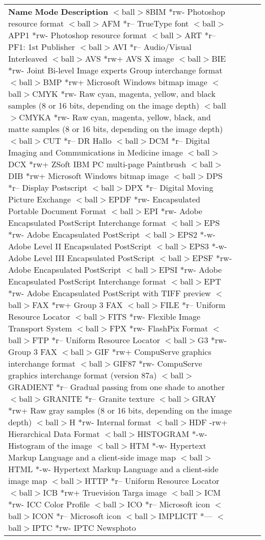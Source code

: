 \begin{longtable}{llll}

{\bf Name}	{\bf Mode}	{\bf Description}
$<$ball$>$8BIM	*rw-	Photoshop resource format
$<$ball$>$AFM	*r--	TrueType font
$<$ball$>$APP1	*rw-	Photoshop resource format
$<$ball$>$ART	*r--	PF1: 1st Publisher
$<$ball$>$AVI	*r--	Audio/Visual Interleaved
$<$ball$>$AVS	*rw+	AVS X image
$<$ball$>$BIE	*rw-	Joint Bi-level Image experts Group
		interchange format
$<$ball$>$BMP	*rw+	Microsoft Windows bitmap image
$<$ball$>$CMYK	*rw-	Raw cyan, magenta, yellow, and black samples
 	 	(8 or 16 bits, depending on the image depth)
$<$ball$>$CMYKA	*rw-	Raw cyan, magenta, yellow, black, and matte
		samples (8 or 16 bits, depending on the image
		depth)
$<$ball$>$CUT	*r--	DR Hallo
$<$ball$>$DCM	*r--	Digital Imaging and Communications in
		 Medicine image
$<$ball$>$DCX	*rw+	ZSoft IBM PC multi-page Paintbrush
$<$ball$>$DIB	*rw+	Microsoft Windows bitmap image
$<$ball$>$DPS	*r--	Display Postscript
$<$ball$>$DPX	*r--	Digital Moving Picture Exchange
$<$ball$>$EPDF	*rw-	Encapsulated Portable Document Format
$<$ball$>$EPI	*rw-	Adobe Encapsulated PostScript Interchange
		format
$<$ball$>$EPS	*rw-	Adobe Encapsulated PostScript
$<$ball$>$EPS2	*-w-	Adobe Level II Encapsulated PostScript
$<$ball$>$EPS3	*-w-	Adobe Level III Encapsulated PostScript
$<$ball$>$EPSF	*rw-	Adobe Encapsulated PostScript
$<$ball$>$EPSI	*rw-	Adobe Encapsulated PostScript Interchange
		format
$<$ball$>$EPT	*rw-	Adobe Encapsulated PostScript with TIFF
		preview
$<$ball$>$FAX	*rw+	Group 3 FAX
$<$ball$>$FILE	*r--	Uniform Resource Locator
$<$ball$>$FITS	*rw-	Flexible Image Transport System
$<$ball$>$FPX	*rw-	FlashPix Format
$<$ball$>$FTP	*r--	Uniform Resource Locator
$<$ball$>$G3	*rw-	Group 3 FAX
$<$ball$>$GIF	*rw+	CompuServe graphics interchange format
$<$ball$>$GIF87	*rw-	CompuServe graphics interchange format
		(version 87a)
$<$ball$>$GRADIENT	*r--	Gradual passing from one shade to another
$<$ball$>$GRANITE	*r--	Granite texture
$<$ball$>$GRAY	*rw+	Raw gray samples (8 or 16 bits, depending
		on the image depth)
$<$ball$>$H	*rw-	Internal format
$<$ball$>$HDF	-rw+	Hierarchical Data Format
$<$ball$>$HISTOGRAM	*-w-	Histogram of the image
$<$ball$>$HTM	*-w-	Hypertext Markup Language and a
		client-side image map
$<$ball$>$HTML	*-w-	Hypertext Markup Language and a
		client-side image map
$<$ball$>$HTTP	*r--	Uniform Resource Locator
$<$ball$>$ICB	*rw+	Truevision Targa image
$<$ball$>$ICM	*rw-	ICC Color Profile
$<$ball$>$ICO	*r--	Microsoft icon
$<$ball$>$ICON	*r--	Microsoft icon
$<$ball$>$IMPLICIT	*---	
$<$ball$>$IPTC	*rw-	IPTC Newsphoto

\end{longtable}
